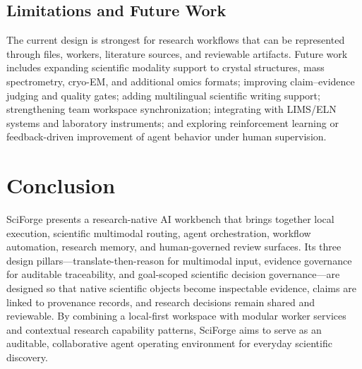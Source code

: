 \documentclass[sn-basic,Numbered,pdflatex]{sn-jnl}
\begin{document}
\subsection{Limitations and Future Work}

The current design is strongest for research workflows that can be represented through files, workers, literature sources, and reviewable artifacts. Future work includes expanding scientific modality support to crystal structures, mass spectrometry, cryo-EM, and additional omics formats; improving claim--evidence judging and quality gates; adding multilingual scientific writing support; strengthening team workspace synchronization; integrating with LIMS/ELN systems and laboratory instruments; and exploring reinforcement learning or feedback-driven improvement of agent behavior under human supervision.

\section{Conclusion}

SciForge presents a research-native AI workbench that brings together local execution, scientific multimodal routing, agent orchestration, workflow automation, research memory, and human-governed review surfaces. Its three design pillars---translate-then-reason for multimodal input, evidence governance for auditable traceability, and goal-scoped scientific decision governance---are designed so that native scientific objects become inspectable evidence, claims are linked to provenance records, and research decisions remain shared and reviewable. By combining a local-first workspace with modular worker services and contextual research capability patterns, SciForge aims to serve as an auditable, collaborative agent operating environment for everyday scientific discovery.
\end{document}

